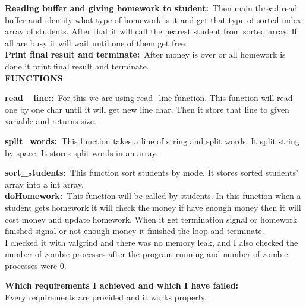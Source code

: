 \documentclass[a4 paper]{article}
\begin{document}
\textbf{Reading buffer and giving homework to student:}\newline\
\phantom{beta}Then main thread read buffer and identify what type of homework is it and get that type of sorted index array of students. After that it will call the nearest student from sorted array. If all are busy it will wait until one of them get free.\newline\\


\textbf{Print final result and terminate:}\newline\
\phantom{beta}After money is over or all homework is done it print final result and terminate.\newline\\

\textbf{\large FUNCTIONS}\newline\

\textbf{read\_ line::}\newline\
\phantom{beta}For this we are using read\_line function. This function will read one by one char until it will get new line char. Then it store that line to given variable and returns size.\newline\

\textbf{split\_words:}\newline\
\phantom{beta}This function takes a line of string and split words. It split string by space. It stores split words in an array.\newline\

\textbf{sort\_students:}\newline\
\phantom{beta}This function sort students by mode. It stores sorted students’ array into a int array.\newline\\

\textbf{doHomework:}\newline\
\phantom{beta}This function will be called by students. In this function when a student gets homework it will check the money if have enough money then it will cost money and update homework. When it get termination signal or homework finished signal or not enough money it finished the loop and terminate.\newline\\

I checked it with valgrind and there was no memory leak, and I also checked the number of zombie processes after the program running and number of zombie processes were 0.\newline

{\color{red}\large\textbf {Which requirements I achieved and which I have failed:}}\newline\\
\phantom{beta}Every requirements are provided and it works properly.
\end{document}
